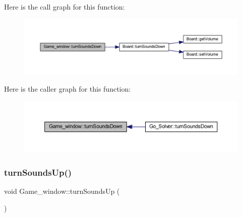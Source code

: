 Here is the call graph for this function\+:
\nopagebreak
\begin{figure}[H]
\begin{center}
\leavevmode
\includegraphics[width=350pt]{class_game__window_aa934e0cb8983cf30af634deff8581848_cgraph}
\end{center}
\end{figure}
Here is the caller graph for this function\+:
\nopagebreak
\begin{figure}[H]
\begin{center}
\leavevmode
\includegraphics[width=350pt]{class_game__window_aa934e0cb8983cf30af634deff8581848_icgraph}
\end{center}
\end{figure}
\mbox{\label{class_game__window_a1ba4f62d58089e3de5da00538889cb25}} 
\subsubsection{\texorpdfstring{turn\+Sounds\+Up()}{turnSoundsUp()}}
{\footnotesize\ttfamily void Game\+\_\+window\+::turn\+Sounds\+Up (\begin{DoxyParamCaption}{ }\end{DoxyParamCaption})}

